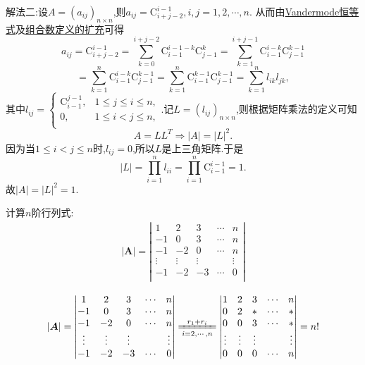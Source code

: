 \documentclass[../../main.tex]{subfiles}
\begin{document}
\begin{solution}
{\color{blue}解法二:}设$A=(a_{ij})_{n\times n}$,则$a_{ij}=\mathrm{C}_{i+j-2}^{i-1} , i,j=1,2,\cdots,n$.
从而由\hyperref[theorem:Vandermode恒等式]{Vandermode恒等式}及\hyperref[definition:组合数定义的扩充]{组合数定义的扩充}可得
\[
a_{ij}=\mathrm{C}_{i+j-2}^{i-1}=\sum_{k=0}^{i+j-2}{\mathrm{C}_{i-1}^{i-1-k}\mathrm{C}_{j-1}^{k}}=\sum_{k=1}^{i+j-1}{\mathrm{C}_{i-1}^{i-k}\mathrm{C}_{j-1}^{k-1}}
\]
\[
=\sum_{k=1}^n{\mathrm{C}_{i-1}^{i-k}\mathrm{C}_{j-1}^{k-1}}=\sum_{k=1}^n{\mathrm{C}_{i-1}^{k-1}\mathrm{C}_{j-1}^{k-1}}=\sum_{k=1}^n{l_{ik}l_{jk}},
\]
其中$l_{ij}=\begin{cases}
\mathrm{C}_{i-1}^{j-1}, & 1\leqslant j\leqslant i\leqslant n, \\
0, & 1\leqslant i<j\leqslant n, \\
\end{cases}$.记$L=\left( l_{ij} \right) _{n\times n}$,则根据矩阵乘法的定义可知
\[
A=LL^T\Rightarrow \left| A \right|=\left| L \right|^2.
\]
因为当$1\leqslant i<j\leqslant n$时,$l_{ij}=0$,所以$L$是上三角矩阵.于是
\[
\left| L \right|=\prod_{i=1}^n{l_{ii}}=\prod_{i=1}^n{\mathrm{C}_{i-1}^{i-1}}=1.
\]
故$\left| A \right|=\left| L \right|^2=1$.
\end{solution}


\begin{example}
计算$n$阶行列式:
\begin{gather}
|\boldsymbol{A}|=\left| \begin{matrix}
1&		2&		3&		\cdots&		n\\
-1&		0&		3&		\cdots&		n\\
-1&		-2&		0&		\cdots&		n\\
\vdots&		\vdots&		\vdots&		&		\vdots\\
-1&		-2&		-3&		\cdots&		0\\
\end{matrix} \right|
\nonumber
\end{gather}
\begin{solution}
\begin{equation}
\begin{split}
|\boldsymbol{A}|=\left| \begin{matrix}
1&		2&		3&		\cdots&		n\\
-1&		0&		3&		\cdots&		n\\
-1&		-2&		0&		\cdots&		n\\
\vdots&		\vdots&		\vdots&		&		\vdots\\
-1&		-2&		-3&		\cdots&		0\\
\end{matrix} \right|
\xlongequal[i=2,\cdots ,n]{r_1+r_i}\left| \begin{matrix}
1&		2&		3&		\cdots&		n\\
0&		2&		*&		\cdots&		*\\
0&		0&		3&		\cdots&		*\\
\vdots&		\vdots&		\vdots&		&		\vdots\\
0&		0&		0&		\cdots&		n\\
\end{matrix} \right|=n!
\end{split}
\nonumber
\end{equation}
\end{solution}
\end{example}
\end{document}
